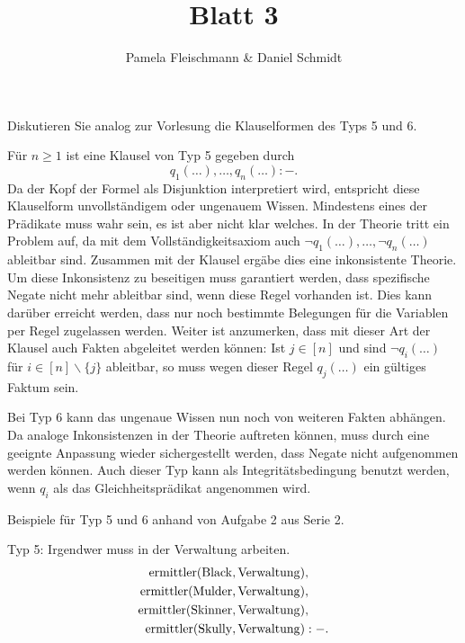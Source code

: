 \documentclass[12pt,a4paper]{amsart}
\begin{document}
\title{Blatt 3}

\author{Pamela Fleischmann \& Daniel Schmidt}
\maketitle


\begin{aufgabe1}
Diskutieren Sie analog zur Vorlesung die Klauselformen des Typs 5 und 6.
\end{aufgabe1}

\medskip

Für $n\geq 1$ ist eine Klausel von Typ 5 gegeben durch
\[
q_1(\dots),\dots,q_n(\dots):-.
\]
Da der Kopf der Formel als Disjunktion interpretiert wird, entspricht diese Klauselform unvollständigem oder ungenauem Wissen. Mindestens eines
der Prädikate muss wahr sein, es ist aber nicht klar welches. In der Theorie tritt ein Problem auf, da mit dem Vollständigkeitsaxiom auch $\lnot q_1(\dots),\dots,
\lnot q_n(\dots)$ ableitbar sind. Zusammen mit der Klausel ergäbe dies eine inkonsistente Theorie. Um diese Inkonsistenz zu beseitigen muss garantiert werden,
dass spezifische Negate nicht mehr ableitbar sind, wenn diese Regel vorhanden ist. Dies kann darüber erreicht werden, dass nur noch bestimmte Belegungen
für die Variablen per Regel zugelassen werden. Weiter ist anzumerken, dass mit dieser Art der Klausel auch Fakten abgeleitet werden können: Ist $j\in[n]$
und sind $\lnot q_i(\dots)$ für $i\in[n]\backslash\{j\}$ ableitbar, so muss wegen dieser Regel $q_j(\dots)$ ein gültiges Faktum sein.

\medskip

Bei Typ 6 kann das ungenaue Wissen nun noch von weiteren Fakten abhängen. Da analoge Inkonsistenzen in der Theorie auftreten können, muss durch
eine geeignte Anpassung wieder sichergestellt werden, dass Negate nicht aufgenommen werden können. Auch dieser Typ kann als Integritätsbedingung benutzt werden, wenn
$q_i$ als das Gleichheitsprädikat angenommen wird.

\bigskip

\begin{aufgabe1}
Beispiele für Typ 5 und 6 anhand von Aufgabe 2 aus Serie 2.
\end{aufgabe1}

\medskip
Typ 5: Irgendwer muss in der Verwaltung arbeiten. \\
\begin{equation}
\begin{split}
\operatorname{ermittler}(\operatorname{Black},\operatorname{Verwaltung})&, \\
\operatorname{ermittler}(\operatorname{Mulder},\operatorname{Verwaltung})&, \\
\operatorname{ermittler}(\operatorname{Skinner},\operatorname{Verwaltung})&, \\
\operatorname{ermittler}(\operatorname{Skully},\operatorname{Verwaltung})&:-.
\end{split}
\end{equation}
\end{document}
